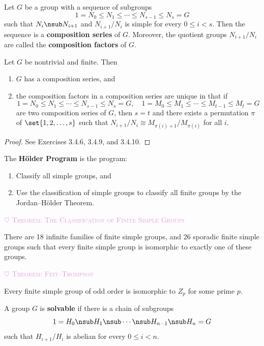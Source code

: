  Let $G$ be a group with a sequence of subgroups
\[1 = N_0 \leq N_1 \leq \cdots \leq N_{s - 1} \leq N_s = G\]
such that $N_i \nsub N_{i + 1}$ and $N_{i + 1}/N_i$ is simple for every $0 \leq i < s$. Then the sequence is a \textbf{composition series} of $G$. Moreover, the quotient groups $N_{i + 1}/N_i$ are called the \textbf{composition factors} of $G$.

 \label{theo3.22}
Let $G$ be nontrivial and finite. Then
\begin{enumerate}
    \item $G$ has a composition series, and
    \item the composition factors in a composition series are unique in that if
    \[1 = N_0 \leq N_1 \leq \cdots \leq N_{s - 1} \leq N_s = G, \quad 1 = M_0 \leq M_1 \leq \cdots \leq M_{t - 1} \leq M_t = G\]
    are two composition series of $G$, then $s = t$ and there exists a permutation $\pi$ of $\set{1, 2, \ldots, s}$ such that $N_{i + 1}/N_i \cong M_{\pi(i) + 1}/M_{\pi(i)}$ for all $i$.
\end{enumerate}

\begin{proof}
    See Exercises 3.4.6, 3.4.9, and 3.4.10.
\end{proof}

 The \textbf{H\"older Program} is the program:
\begin{enumerate}
    \item Classify all simple groups, and
    \item Use the classification of simple groups to classify all finite groups by the Jordan--H\"older Theorem.
\end{enumerate}

\noindent \textcolor{Plum}{{\large$\heartsuit$} \squad \textsc{Theorem: The Classification of Finite Simple Groups}}

There are 18 infinite families of finite simple groups, and 26 sporadic finite simple groups such that every finite simple group is isomorphic to exactly one of these groups.

\noindent \textcolor{Plum}{{\large$\heartsuit$} \squad \textsc{Theorem: Feit--Thompson}}

Every finite simple group of odd order is isomorphic to $Z_p$ for some prime $p$.

 A group $G$ is \textbf{solvable} if there is a chain of subgroups
\[1 = H_0 \nsub H_1 \nsub \cdots \nsub H_{n - 1} \nsub H_n = G\]
such that $H_{i + 1}/H_i$ is abelian for every $0 \leq i < n$.


